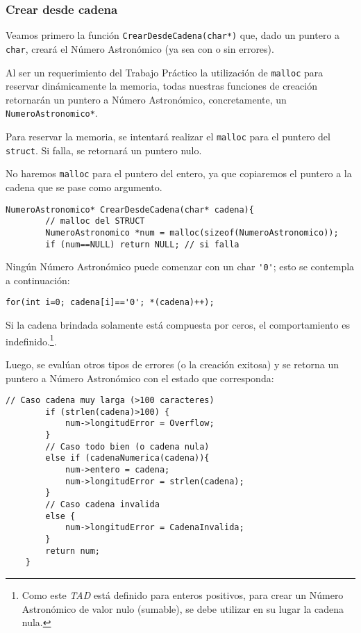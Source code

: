 \documentclass[a4paper, 12pt]{article}
\begin{document}
\subsubsection{Crear desde cadena} \label{crear-desde-cadena}
Veamos primero la función \verb|CrearDesdeCadena(char*)| que, dado un puntero a \verb|char|, creará el Número Astronómico (ya sea con o sin errores).

Al ser un requerimiento del Trabajo Práctico la utilización de \verb|malloc| para reservar dinámicamente la memoria, todas nuestras funciones de creación retornarán un puntero a Número Astronómico, concretamente, un \verb|NumeroAstronomico*|.

Para reservar la memoria, se intentará realizar el \verb|malloc| para el puntero del \verb|struct|. Si falla, se retornará un puntero nulo.

No haremos \verb|malloc| para el puntero del entero, ya que copiaremos el puntero a la cadena que se pase como argumento.

\begin{lstlisting}[style=C]
    NumeroAstronomico* CrearDesdeCadena(char* cadena){
        // malloc del STRUCT
        NumeroAstronomico *num = malloc(sizeof(NumeroAstronomico));
        if (num==NULL) return NULL; // si falla
\end{lstlisting}

Ningún Número Astronómico puede comenzar con un char \verb|'0'|; esto se contempla a continuación:

\begin{lstlisting}[style=C]
    for(int i=0; cadena[i]=='0'; *(cadena)++);
\end{lstlisting}

Si la cadena brindada solamente está compuesta por ceros, el comportamiento es indefinido.\footnote{Como este \emph{TAD} está definido para enteros positivos, para crear un Número Astronómico de valor nulo (sumable), se debe utilizar en su lugar la cadena nula.}.

Luego, se evalúan otros tipos de errores (o la creación exitosa) y se retorna un puntero a Número Astronómico con el estado que corresponda:

\begin{lstlisting}[style=C]
        // Caso cadena muy larga (>100 caracteres)
        if (strlen(cadena)>100) {
            num->longitudError = Overflow;
        }
        // Caso todo bien (o cadena nula)
        else if (cadenaNumerica(cadena)){
            num->entero = cadena;
            num->longitudError = strlen(cadena);
        }
        // Caso cadena invalida
        else {
            num->longitudError = CadenaInvalida;
        }
        return num;
    }
\end{lstlisting}
\end{document}
